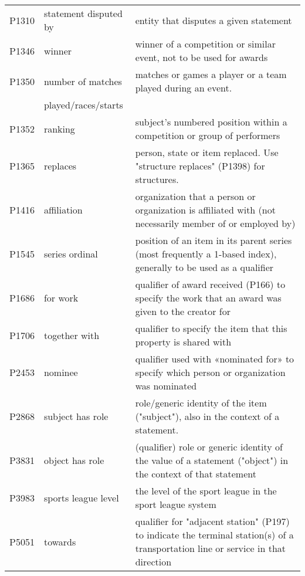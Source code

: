 \documentclass[11pt]{article}
\newcommand{\dataname}{HyperRED}
\begin{document}
\begin{table*}[!t]
{\begin{tabular}{lll}
P1310 & statement disputed by & entity that disputes a given statement \\
P1346 & winner & winner of a competition or similar event, not to be used for awards \\
P1350 & number of matches  & matches or games a player or a team played during an event. \\
& played/races/starts & \\
P1352 & ranking & subject's numbered position within a competition or group of performers \\                                                              
P1365 & replaces & person, state or item replaced. Use "structure replaces" (P1398) for structures. \\                                                                                                        
P1416 & affiliation & organization that a person or organization is affiliated with (not necessarily member of or employed by) \\                         
P1545 & series ordinal & position of an item in its parent series (most frequently a 1-based index), generally to be used as a qualifier \\                                                          
P1686 & for work & qualifier of award received (P166) to specify the work that an award was given to the creator for \\                                   
P1706 & together with & qualifier to specify the item that this property is shared with \\                                                                
P2453 & nominee & qualifier used with «nominated for» to specify which person or organization was nominated \\                                            
P2868 & subject has role & role/generic identity of the item ("subject"), also in the context of a statement. \\
P3831 & object has role & (qualifier) role or generic identity of the value of a statement ("object") in the context of that statement \\
P3983 & sports league level & the level of the sport league in the sport league system \\                                        
P5051 & towards & qualifier for "adjacent station" (P197) to indicate the terminal station(s) of a transportation line or service in that direction \\
    \bottomrule
    \end{tabular}
    }
   \caption{List of qualifier labels in \dataname{}.} 
    \label{tab:qualifiers}
\end{table*}
\end{document}

